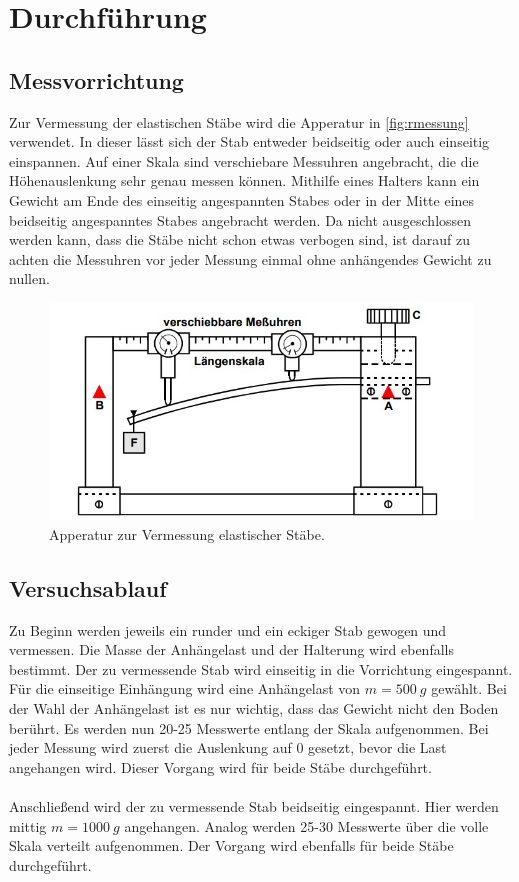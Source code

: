 \section{Durchführung}
\label{sec:Durchführung}

\subsection{Messvorrichtung}
Zur Vermessung der elastischen Stäbe wird die Apperatur in \autoref{fig:rmessung} verwendet. In dieser lässt sich der Stab entweder beidseitig oder auch
einseitig einspannen. Auf einer Skala sind verschiebare Messuhren angebracht, die die Höhenauslenkung sehr genau messen können. Mithilfe eines Halters kann 
ein Gewicht am Ende des einseitig angespannten Stabes oder in der Mitte eines beidseitig angespanntes Stabes angebracht werden. Da nicht ausgeschlossen werden kann,
dass die Stäbe nicht schon etwas verbogen sind, ist darauf zu achten die Messuhren vor jeder Messung einmal ohne anhängendes Gewicht zu nullen.
\begin{figure}[H]
    \includegraphics[width=\linewidth]{img/abb5.jpg}
    \caption{Apperatur zur Vermessung elastischer Stäbe.\cite{V103}}
    \label{fig:messung}
\end{figure}

\subsection{Versuchsablauf}
Zu Beginn werden jeweils ein runder und ein eckiger Stab gewogen und vermessen. Die Masse der Anhängelast und der Halterung wird ebenfalls bestimmt.
Der zu vermessende Stab wird einseitig in die Vorrichtung eingespannt. Für die einseitige Einhängung wird eine Anhängelast von $m = \SI{500}{g}$ gewählt. 
Bei der Wahl der Anhängelast ist es nur wichtig, dass das Gewicht nicht den Boden berührt. Es werden nun 20-25 Messwerte entlang der Skala aufgenommen. 
Bei jeder Messung wird zuerst die Auslenkung auf 0 gesetzt, bevor die Last angehangen wird. Dieser Vorgang wird für beide Stäbe durchgeführt.
\\
\\
Anschließend wird der zu vermessende Stab beidseitig eingespannt. Hier werden mittig $m = \SI{1000}{g}$ angehangen. Analog werden 25-30 Messwerte über die
volle Skala verteilt aufgenommen. Der Vorgang wird ebenfalls für beide Stäbe durchgeführt.